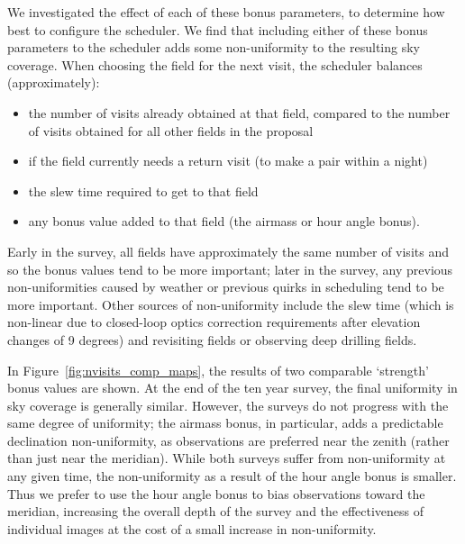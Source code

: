 \documentclass[DM,lsstdraft,authoryear,toc]{lsstdoc}
\begin{document}
We investigated the effect of each of these bonus parameters, to determine how best to configure the scheduler. We find that including either of these bonus parameters to the scheduler adds some non-uniformity to the resulting sky coverage. When choosing the field for the next visit, the scheduler balances (approximately):
\begin{itemize}
\item the number of visits already obtained at that field, compared to the number of visits obtained for all other fields in the proposal
\item if the field currently needs a return visit (to make a pair within a night)
\item the slew time required to get to that field
\item any bonus value added to that field (the airmass or hour angle bonus).
\end{itemize}
Early in the survey, all fields have approximately the same number of visits and so the bonus values tend to be more important; later in the survey, any previous non-uniformities caused by weather or previous quirks in scheduling tend to be more important. Other sources of non-uniformity include the slew time (which is non-linear due to closed-loop optics correction requirements after elevation changes of 9 degrees) and revisiting fields or observing deep drilling fields.

In Figure~\ref{fig:nvisits_comp_maps}, the results of two comparable `strength' bonus values are shown. At the end of the ten year survey, the final uniformity in sky coverage is generally similar. However, the surveys do not progress with the same degree of uniformity; the airmass bonus, in particular, adds a predictable declination non-uniformity, as observations are preferred near the zenith (rather than just near the meridian). While both surveys suffer from non-uniformity at any given time, the non-uniformity as a result of the hour angle bonus is smaller. Thus we prefer to use the hour angle bonus to bias observations toward the meridian, increasing the overall depth of the survey and the effectiveness of individual images at the cost of a small increase in non-uniformity.
\end{document}
